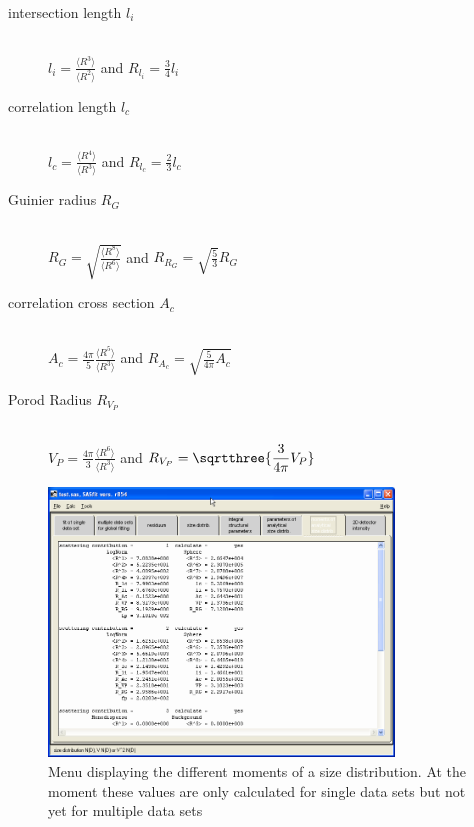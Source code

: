 ~\\
\begin{description}
\item[intersection length $l_i$]~\\
$\displaystyle l_i = \frac{\langle R^3\rangle}{\langle R^2\rangle}
$ and  $\displaystyle R_{l_i} = \frac{3}{4} l_i $

\item[correlation length $l_c$]~\\
$\displaystyle l_c = \frac{\langle R^4\rangle}{\langle R^3\rangle}
$ and  $\displaystyle R_{l_c} = \frac{2}{3} l_c $

\item[Guinier radius $R_G$]~\\
$\displaystyle R_G = \sqrt{\frac{\langle R^8\rangle}{\langle
R^6\rangle}} $ and  $\displaystyle R_{R_G} = \sqrt{\frac{5}{3}}
R_G $

\item[correlation cross section $A_c$]~\\
$\displaystyle A_c = \frac{4\pi}{5}\frac{\langle
R^5\rangle}{\langle R^3\rangle} $ and  $\displaystyle R_{A_c} =
\sqrt{\frac{5}{4\pi} A_c} $

\item[Porod Radius $R_{V_P}$]~\\
$\displaystyle V_P = \frac{4\pi}{3}\frac{\langle
R^6\rangle}{\langle R^3\rangle} $ and  $\displaystyle R_{V_P} =
\sqrtthree{\frac{3}{4\pi} V_P} $
\end{description}


\begin{figure}[htb]
\begin{center}
\includegraphics[width=0.818\textwidth,height=0.637\textwidth]{QTmoments.png}
\end{center}
\caption{Menu displaying the different moments of a size
distribution. At the moment these values are only calculated for
single data sets but not yet for multiple data sets}
\label{fig:QTmoments}
\end{figure}

